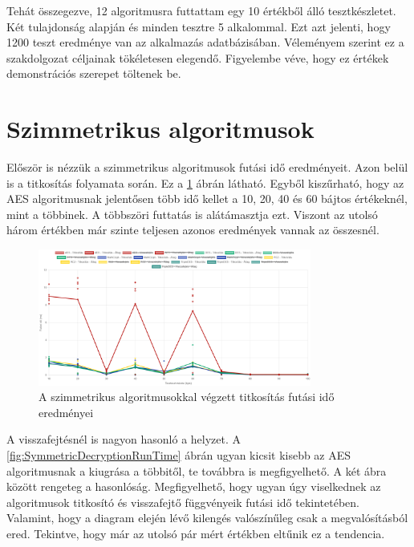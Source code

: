 \documentclass[12pt]{report} %
\begin{document}
Tehát összegezve, 12 algoritmusra futtattam egy 10 értékből álló tesztkészletet. Két tulajdonság alapján és minden tesztre 5 alkalommal. Ezt azt jelenti, hogy 1200 teszt eredménye van az alkalmazás adatbázisában. Véleményem szerint ez a szakdolgozat céljainak tökéletesen elegendő. Figyelembe véve, hogy ez értékek demonstrációs szerepet töltenek be.

\section{Szimmetrikus algoritmusok} %

Először is nézzük a szimmetrikus algoritmusok futási idő eredményeit. Azon belül is a titkosítás folyamata során. Ez a \ref{fig:SymmetricEncryptionRunTime} ábrán látható. Egyből kiszűrható, hogy az AES algoritmusnak jelentősen több idő kellet a 10, 20, 40 és 60 bájtos értékeknél, mint a többinek. A többszöri futtatás is alátámasztja ezt. Viszont az utolsó három értékben már szinte teljesen azonos eredmények vannak az összesnél.

\begin{figure}[H]
    \centering %
    \includegraphics[width=0.8\textwidth]{Figures/SymmetricEncryptionRunTime.png} %
    \caption{A szimmetrikus algoritmusokkal végzett titkosítás futási idő eredményei} %
    \label{fig:SymmetricEncryptionRunTime} %
\end{figure}

A visszafejtésnél is nagyon hasonló a helyzet. A \ref{fig:SymmetricDecryptionRunTime} ábrán ugyan kicsit kisebb az AES algoritmusnak a kiugrása a többitől, te továbbra is megfigyelhető. A két ábra között rengeteg a hasonlóság. Megfigyelhető, hogy ugyan úgy viselkednek az algoritmusok titkosító és visszafejtő függvényeik futási idő tekintetében. Valamint, hogy a diagram elején lévő kilengés valószínűleg csak a megvalósításból ered. Tekintve, hogy már az utolsó pár mért értékben eltűnik ez a tendencia.
\end{document}
